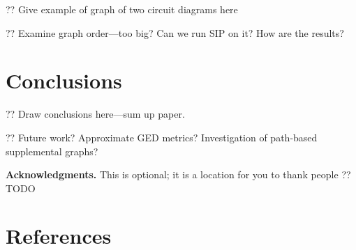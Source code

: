 \documentclass{mpaper}
\begin{document}
?? Give example of graph of two circuit diagrams here

?? Examine graph order---too big? Can we run SIP on it? How are the results?

\section{Conclusions}
\label{sec:conclusion}

?? Draw conclusions here---sum up paper.

?? Future work? Approximate GED metrics? Investigation of path-based supplemental graphs?

\noindent
{\bf Acknowledgments.}
This is optional; it is a location for you to thank people ?? TODO

\section{References}
\printbibliography[heading=none]

\vspace{1em}
\end{document}
